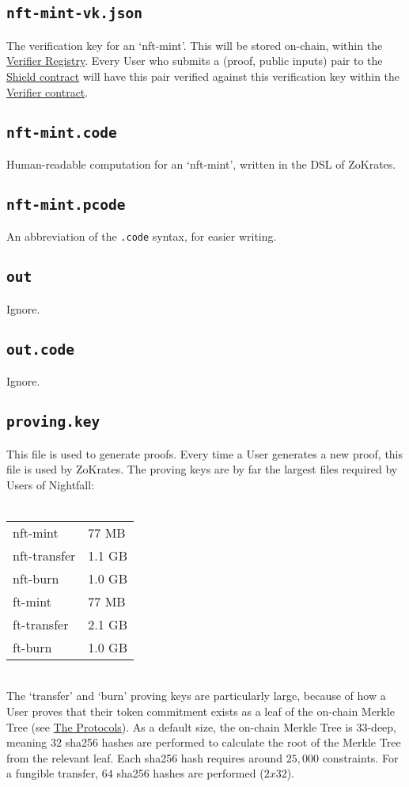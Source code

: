 \documentclass{article}
\begin{document}
\subsection*{\texttt{nft-mint-vk.json}}
The verification key for an `nft-mint'. This will be stored on-chain, within the \hyperref[sec:smartContracts]{Verifier Registry}. Every User who submits a (proof, public inputs) pair to the \hyperref[sec:smartContracts]{Shield contract} will have this pair verified against this verification key within the \hyperref[sec:smartContracts]{Verifier contract}.
\subsection*{\texttt{nft-mint.code}}
Human-readable computation for an `nft-mint', written in the DSL of ZoKrates.
\subsection*{\texttt{nft-mint.pcode}}
An abbreviation of the \texttt{.code} syntax, for easier writing.
\subsection*{\texttt{out}}
Ignore.
\subsection*{\texttt{out.code}}
Ignore.
\subsection*{\texttt{proving.key}}
This file is used to generate proofs. Every time a User generates a new proof, this file is used by ZoKrates. The proving keys are by far the largest files required by Users of Nightfall:\\
\\
\begin{tabular}{l l}
  nft-mint & 77 MB\\
  nft-transfer & 1.1 GB\\
  nft-burn & 1.0 GB\\
  ft-mint & 77 MB\\
  ft-transfer & 2.1 GB\\
  ft-burn & 1.0 GB\\
\end{tabular}
\ \\

\noindent
The `transfer' and `burn' proving keys are particularly large, because of how a User proves that their token commitment exists as a leaf of the on-chain Merkle Tree (see \hyperref[part:theProtocols]{The Protocols}). As a default size, the on-chain Merkle Tree is 33-deep, meaning $32$ sha256 hashes are performed to calculate the root of the Merkle Tree from the relevant leaf. Each sha256 hash requires around $25,000$ constraints. For a fungible transfer, $64$ sha256 hashes are performed ($2 x 32$).
\end{document}

